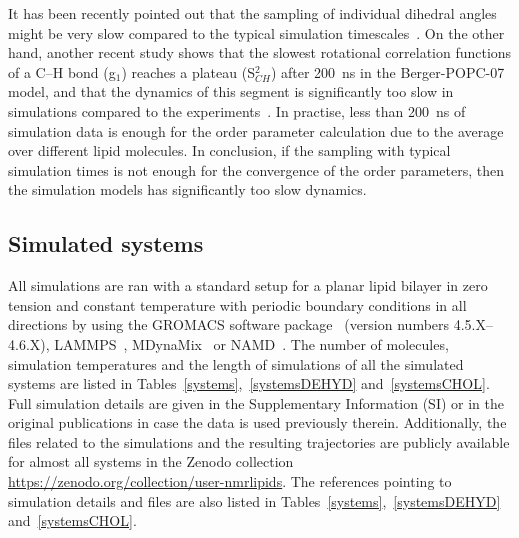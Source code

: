 \documentclass[journal=jacsat,manuscript=article]{achemso}
\begin{document}
It has been recently pointed out that the sampling of individual dihedral angles might be very
slow compared to the typical simulation timescales~\cite{vogel12}. On the other hand, another recent
study shows that the slowest rotational correlation functions of a C--H bond (g$_1$) reaches a plateau (S$_{CH}^2$)
after 200~ns in the Berger-POPC-07~\cite{ollila07a} model, and that the dynamics of this segment is significantly too slow in simulations
compared to the experiments~\cite{ferreira15}. In practise, less than 200~ns of simulation data is enough for the order parameter
calculation due to the average over different lipid molecules. In conclusion, if the sampling with typical simulation times
is not enough for the convergence of the order parameters, then the simulation models has significantly too slow dynamics.





\subsection{Simulated systems}
All simulations are ran with a standard setup for a planar lipid bilayer in zero tension and constant temperature
with periodic boundary conditions in all directions by using the GROMACS software package~\cite{hess08} 
(version numbers 4.5.X--4.6.X), LAMMPS~\cite{plimpton95}, MDynaMix~\cite{Lyubartsev00} or NAMD~\cite{phillips05}.
The number of molecules, simulation temperatures and the length of simulations of all the simulated systems 
are listed in Tables~\ref{systems},~\ref{systemsDEHYD} and~\ref{systemsCHOL}. Full simulation
details are given in the Supplementary Information (SI) or in the original publications in case the
data is used previously therein. Additionally, the files related to the simulations and the resulting trajectories are publicly
available for almost all systems in the Zenodo collection \url{https://zenodo.org/collection/user-nmrlipids}. 
The references pointing to simulation details and files are also listed in Tables~\ref{systems},~\ref{systemsDEHYD} and~\ref{systemsCHOL}.
\end{document}
